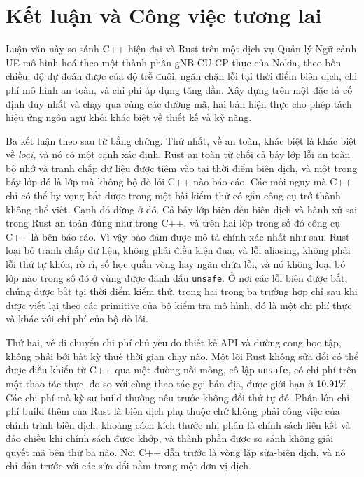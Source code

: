 \chapter{Kết luận và Công việc tương lai\label{chapter:conclusions}}

Luận văn này so sánh C++ hiện đại và Rust trên một dịch vụ Quản lý Ngữ cảnh UE mô hình hoá theo
một thành phần gNB-CU-CP thực của Nokia, theo bốn chiều: độ dự đoán được của độ trễ đuôi, ngăn
chặn lỗi tại thời điểm biên dịch, chi phí mô hình an toàn, và chi phí áp dụng tăng dần. Xây dựng
trên một đặc tả cố định duy nhất và chạy qua cùng các đường mã, hai bản hiện thực cho phép tách
hiệu ứng ngôn ngữ khỏi khác biệt về thiết kế và kỹ năng.

Ba kết luận theo sau từ bằng chứng. Thứ nhất, về an toàn, khác biệt là khác biệt về \emph{loại}, và
nó có một cạnh xác định. Rust an toàn từ chối cả bảy lớp lỗi an toàn bộ nhớ và tranh chấp dữ liệu
được tiêm vào tại thời điểm biên dịch, và một trong bảy lớp đó là lớp mà không bộ dò lỗi C++ nào
báo cáo. Các mối nguy mà C++ chỉ có thể hy vọng bắt được trong một bài kiểm thử có gắn công cụ trở
thành không thể viết. Cạnh đó dừng ở đó.
Cả bảy lớp biên
đều biên dịch và hành xử sai trong Rust an toàn đúng như trong C++, và trên hai lớp trong số đó
công cụ C++ là bên báo cáo. Vì vậy bảo đảm được mô tả chính xác nhất như sau. Rust loại bỏ tranh
chấp dữ liệu, không phải điều kiện đua, và lỗi aliasing, không phải lỗi thứ tự khóa, rò rỉ, số học
quấn vòng hay ngăn chứa lỗi, và nó không loại bỏ lớp nào trong số đó ở vùng được đánh dấu
\texttt{unsafe}. Ở nơi các lỗi biên được bắt, chúng được
bắt tại thời điểm kiểm thử, trong hai trong ba trường hợp chỉ sau khi được viết lại theo các
primitive của bộ kiểm tra mô hình, đó là một chi phí thực và khác với chi phí của bộ dò lỗi.

Thứ hai, về di chuyển
chi phí chủ yếu do thiết kế API và đường cong học tập, không phải bởi bất kỳ thuế thời gian chạy
nào. Một lõi Rust không sửa đổi có thể được điều khiển từ C++ qua một đường nối mỏng, cô lập
\texttt{unsafe}, có chi phí trên một thao tác thực, đo so với cùng thao tác gọi bản địa, được giới
hạn ở $10.91\%$. Các chi phí mà kỹ sư build thường nêu trước không đổi thứ tự đó.
Phần lớn chi phí build thêm của Rust là biên dịch phụ thuộc chứ không phải công việc của chính
trình biên dịch, khoảng cách kích thước nhị phân là chính sách liên kết và đảo chiều khi chính sách
được khớp, và thành phần được so sánh không giải quyết mã bên thứ ba nào. Nơi C++ dẫn trước là vòng
lặp sửa-biên dịch, và nó chỉ dẫn trước với các sửa đổi nằm trong một đơn vị dịch.

